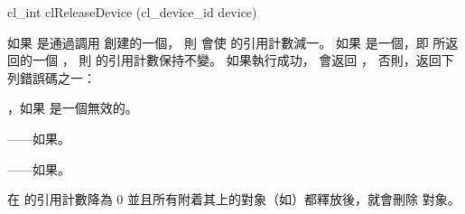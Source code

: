 \startCLFUNC
cl_int clReleaseDevice (cl_device_id device)
\stopCLFUNC

如果  是通過調用  創建的一個，
則  會使  的引用計數減一。
如果  是一個，即  所返回的一個 ，
則  的引用計數保持不變。
如果執行成功， 會返回 ，
否則，返回下列錯誤碼之一：
\startigBase
\item {}，如果  是一個無效的。
\item {}——如果\scdevfailres。
\item {}——如果\schostfailres。
\stopigBase

在  的引用計數降為 0 並且所有附着其上的對象（如）都釋放後，就會刪除  對象。

